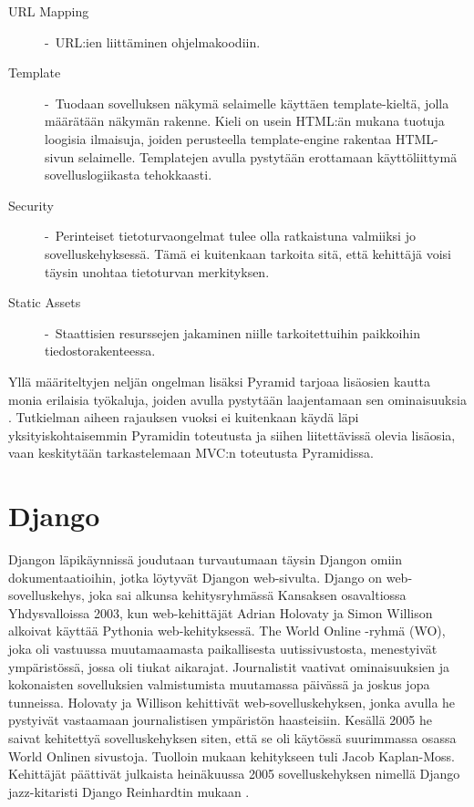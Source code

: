 \documentclass[utf8]{gradu3}
\begin{document}
\begin{description}
\item [URL Mapping] -\ URL:ien liittäminen ohjelmakoodiin.
\item[Template] -\ Tuodaan sovelluksen näkymä selaimelle käyttäen template-kieltä, jolla määrätään näkymän rakenne. Kieli on usein HTML:än mukana tuotuja loogisia ilmaisuja, joiden perusteella template-engine rakentaa HTML-sivun selaimelle. Templatejen avulla pystytään erottamaan käyttöliittymä sovelluslogiikasta tehokkaasti.
\item[Security] -\ Perinteiset tietoturvaongelmat tulee olla ratkaistuna valmiiksi jo sovelluskehyksessä. Tämä ei kuitenkaan tarkoita sitä, että kehittäjä voisi täysin unohtaa tietoturvan merkityksen.
\item[Static Assets] -\ Staattisien resurssejen jakaminen niille tarkoitettuihin paikkoihin tiedostorakenteessa.
\end{description}
Yllä määriteltyjen neljän ongelman lisäksi Pyramid tarjoaa lisäosien kautta monia erilaisia työkaluja, joiden avulla pystytään laajentamaan sen ominaisuuksia \parencite{pyramid_intr}. Tutkielman aiheen rajauksen vuoksi ei kuitenkaan
käydä läpi yksityiskohtaisemmin Pyramidin toteutusta ja siihen liitettävissä olevia lisäosia, vaan keskitytään tarkastelemaan MVC:n toteutusta Pyramidissa.

\section{Django}
Djangon läpikäynnissä joudutaan turvautumaan täysin Djangon omiin dokumentaatioihin, jotka löytyvät Djangon web-sivulta. Django on web-sovelluskehys, joka  sai alkunsa kehitysryhmässä Kansaksen osavaltiossa Yhdysvalloissa 2003, kun web-kehittäjät Adrian Holovaty ja Simon Willison alkoivat käyttää Pythonia web-kehityksessä. The World Online -ryhmä (WO), joka oli vastuussa muutamaamasta paikallisesta uutissivustosta, menestyivät ympäristössä, jossa oli tiukat aikarajat. Journalistit vaativat ominaisuuksien ja kokonaisten sovelluksien valmistumista muutamassa päivässä ja joskus jopa tunneissa. Holovaty ja Willison kehittivät web-sovelluskehyksen, jonka avulla he pystyivät vastaamaan journalistisen ympäristön haasteisiin. Kesällä 2005 he saivat kehitettyä sovelluskehyksen siten, että se oli käytössä suurimmassa osassa World Onlinen sivustoja. Tuolloin mukaan kehitykseen tuli Jacob Kaplan-Moss. Kehittäjät päättivät julkaista heinäkuussa 2005 sovelluskehyksen nimellä Django jazz-kitaristi Django Reinhardtin mukaan \parencite{django_history}.
\end{document}
